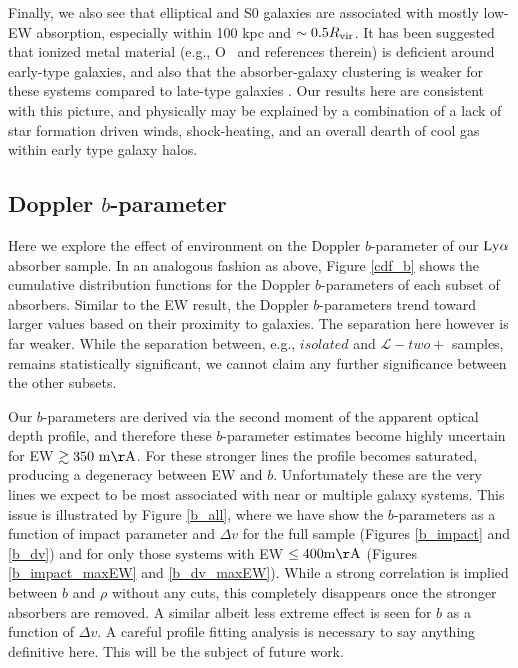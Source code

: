 Finally, we also see that elliptical and S0 galaxies are associated with mostly low-EW absorption, especially within 100 kpc and $\sim 0.5 R_{\rm vir}$. It has been suggested that ionized metal material (e.g., O\VI~\citealt{tumlinson2011} and references therein) is deficient around early-type galaxies, and also that the absorber-galaxy clustering is weaker for these systems compared to late-type galaxies \citep{chen2005}. Our results here are consistent with this picture, and physically may be explained by a combination of a lack of star formation driven winds, shock-heating, and an overall dearth of cool gas within early type galaxy halos.


\subsection{Doppler $b$-parameter}

Here we explore the effect of environment on the Doppler $b$-parameter of our $\rm Ly\alpha$ absorber sample. In an analogous fashion as above, Figure \ref{cdf_b} shows the cumulative distribution functions for the Doppler $b$-parameters of each subset of absorbers. Similar to the EW result, the Doppler $b$-parameters trend toward larger values based on their proximity to galaxies. The separation here however is far weaker. While the separation between, e.g., $isolated$ and $\mathcal{L}-two+$ samples, remains statistically significant, we cannot claim any further significance between the other subsets. 

Our $b$-parameters are derived via the second moment of the apparent optical depth profile, and therefore these $b$-parameter estimates become highly uncertain for EW $\rm \gtrsim 350~m\AA$. For these stronger lines the profile becomes saturated, producing a degeneracy between EW and $b$. Unfortunately these are the very lines we expect to be most associated with near or multiple galaxy systems. This issue is illustrated by Figure \ref{b_all}, where we have show the $b$-parameters as a function of impact parameter and $\Delta v$  for the full sample (Figures \ref{b_impact} and \ref{b_dv}) and for only those systems with EW $\rm \leq 400 m\AA$ (Figures \ref{b_impact_maxEW} and \ref{b_dv_maxEW}). While a strong correlation is implied between $b$ and $\rho$ without any cuts, this completely disappears once the stronger absorbers are removed. A similar albeit less extreme effect is seen for $b$ as a function of $\Delta v$. A careful profile fitting analysis is necessary to say anything definitive here. This will be the subject of future work.

